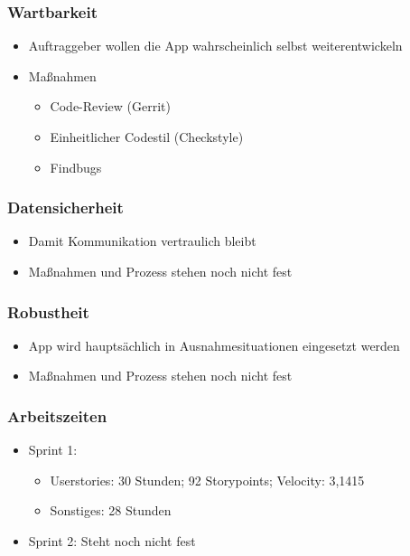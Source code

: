 \documentclass[accentcolor=tud4c,colorbacktitle]{tudbeamer}
\begin{document}
    \begin{frame}
      \frametitle{Wartbarkeit}
      \begin{itemize}
        \item Auftraggeber wollen die App wahrscheinlich selbst weiterentwickeln
        \item Maßnahmen
        \begin{itemize}
          \item Code-Review (Gerrit)
          \item Einheitlicher Codestil (Checkstyle)
          \item Findbugs
        \end{itemize}
      \end{itemize}
    \end{frame}
    \begin{frame}
      \frametitle{Datensicherheit}
      \begin{itemize}
        \item Damit Kommunikation vertraulich bleibt
        \item Maßnahmen und Prozess stehen noch nicht fest
      \end{itemize}
    \end{frame}
    \begin{frame}
      \frametitle{Robustheit}
      \begin{itemize}
        \item App wird hauptsächlich in Ausnahmesituationen eingesetzt werden
        \item Maßnahmen und Prozess stehen noch nicht fest
      \end{itemize}
    \end{frame}
    \begin{frame}
      \frametitle{Arbeitszeiten}
      \begin{itemize}
        \item Sprint 1:
          \begin{itemize}
            \item Userstories: 30 Stunden; 92 Storypoints; Velocity: 3,1415
            \item Sonstiges: 28 Stunden
          \end{itemize}
        \item Sprint 2: Steht noch nicht fest
      \end{itemize}
    \end{frame}
  
\end{document}
